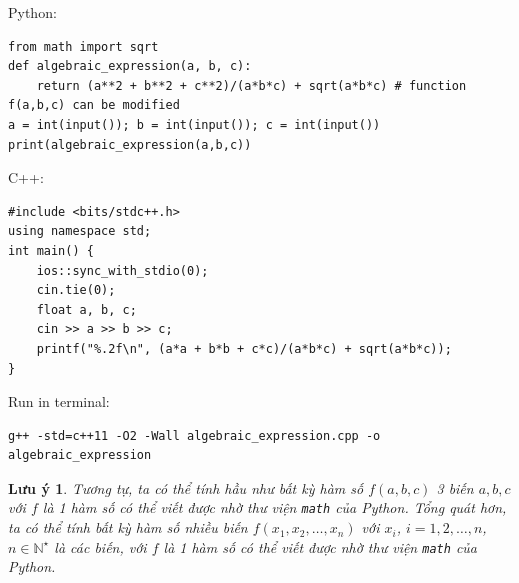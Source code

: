 \documentclass{article}
\newtheorem{luuy}{Lưu ý}
\begin{document}
Python:
\begin{verbatim}
from math import sqrt
def algebraic_expression(a, b, c):
    return (a**2 + b**2 + c**2)/(a*b*c) + sqrt(a*b*c) # function f(a,b,c) can be modified
a = int(input()); b = int(input()); c = int(input())
print(algebraic_expression(a,b,c))
\end{verbatim}
C++:
\begin{verbatim}
#include <bits/stdc++.h>
using namespace std;
int main() {
    ios::sync_with_stdio(0);
    cin.tie(0);
    float a, b, c;
    cin >> a >> b >> c;
    printf("%.2f\n", (a*a + b*b + c*c)/(a*b*c) + sqrt(a*b*c));
}
\end{verbatim}
Run in terminal:
\begin{verbatim}
g++ -std=c++11 -O2 -Wall algebraic_expression.cpp -o algebraic_expression
\end{verbatim}

\begin{luuy}
	Tương tự, ta có thể tính hầu như bất kỳ hàm số $f(a,b,c)$ 3 biến $a,b,c$ với $f$ là 1 hàm số có thể viết được nhờ thư viện \texttt{math} của Python. Tổng quát hơn, ta có thể tính bất kỳ hàm số nhiều biến $f(x_1,x_2,\ldots,x_n)$ với $x_i$, $i = 1,2,\ldots,n$, $n\in\mathbb{N}^\star$ là các biến, với $f$ là 1 hàm số có thể viết được nhờ thư viện \texttt{math} của Python.
\end{luuy}
\end{document}
